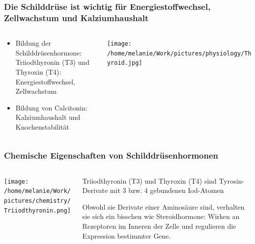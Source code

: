 \documentclass{beamer}
\begin{document}
\begin{frame}
\frametitle{Die Schilddrüse ist wichtig für Energiestoffwechsel, Zellwachstum und Kalziumhaushalt}

\begin{columns}[c]
\begin{column}{5cm}
\begin{itemize}
\item
Bildung der \textcolor{theme}{Schilddrüsenhormone}:\\
 Triiodthyronin (T3) und Thyroxin (T4): \\
Energiestoffwechsel, Zellwachstum
\item
Bildung von Calcitonin: \\ Kalziumhaushalt und Knochenstabilität

\end{itemize}

\end{column}

\begin{column}{5cm}

\texttt{[image: /home/melanie/Work/pictures/physiology/Thyroid.jpg]}

\end{column}

\end{columns}

\end{frame}






\begin{frame}
\frametitle{Chemische Eigenschaften von Schilddrüsenhormonen}



\begin{columns}[c]
\begin{column}{5cm}
\begin{center}
\texttt{[image: /home/melanie/Work/pictures/chemistry/Triiodthyronin.png]}
\end{center}
\end{column}
\begin{column}{5cm}
Triiodthyronin (T3) und Thyroxin (T4) sind Tyrosin-Derivate mit 3 bzw. 4 gebundenen Iod-Atomen \\[0.2 cm]
\pause

Obwohl sie Derivate einer Aminosäure sind, verhalten sie sich ein bisschen wie Steroidhormone: Wirken an Rezeptoren im Inneren der Zelle und regulieren die Expression bestimmter Gene.  

\end{column}
\end{columns}

\end{frame}
\end{document}
